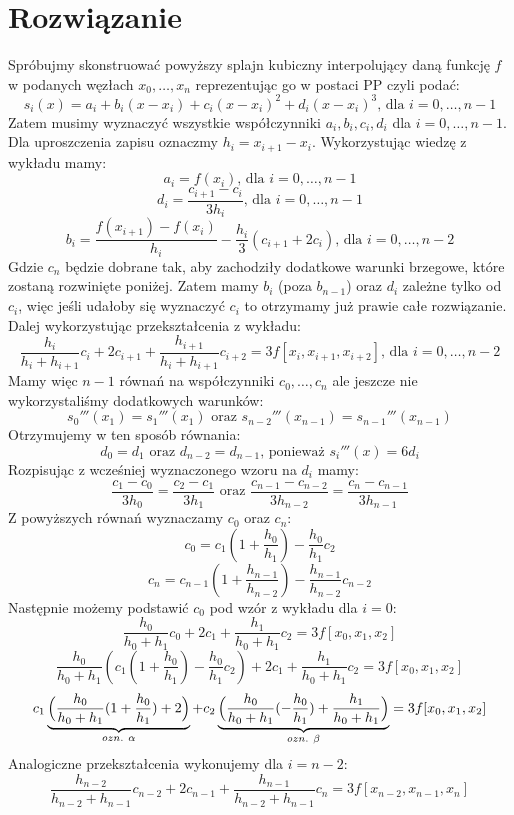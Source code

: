 \documentclass[a4paper]{article}
\begin{document}
\section*{\large Rozwiązanie }
Spróbujmy skonstruować powyższy splajn kubiczny interpolujący daną funkcję $f$ w podanych węzłach $x_0, \dots, x_n$ reprezentując go w postaci PP czyli podać:
$$
s_i(x) = a_i + b_i(x-x_i) + c_i(x-x_i)^2 + d_i(x-x_i)^3 \text{, dla } i = 0,\dots,n-1
$$
Zatem musimy wyznaczyć wszystkie współczynniki $a_i, b_i, c_i, d_i$ dla $i = 0,\dots,n-1$. Dla uproszczenia zapisu oznaczmy $h_i=x_{i+1}-x_i$. Wykorzystując wiedzę z wykładu mamy:
$$
a_i = f(x_i) \text{, dla } i = 0,\dots,n-1
$$
$$
d_i = \frac{c_{i+1}-c_i}{3h_i} \text{, dla } i = 0,\dots,n-1
$$
$$
b_i = \frac{f(x_{i+1})-f(x_{i})}{h_{i}}-\frac{h_{i}}{3}(c_{i+1}+2c_i) \text{, dla } i = 0,\dots,n-2
$$
Gdzie $c_n$ będzie dobrane tak, aby zachodziły dodatkowe warunki brzegowe, które zostaną rozwinięte poniżej. Zatem mamy $b_i$ (poza $b_{n-1}$) oraz $d_i$ zależne tylko od $c_i$, więc jeśli udałoby się wyznaczyć $c_i$ to otrzymamy już prawie całe rozwiązanie. Dalej wykorzystując przekształcenia z wykładu:
$$
\frac{h_i}{h_i+h_{i+1}}c_i + 2c_{i+1} + \frac{h_{i+1}}{h_i + h_{i+1}}c_{i+2} = 3f[x_i, x_{i+1},x_{i+2}] \text{, dla } i = 0,\dots,n-2
$$
Mamy więc $n-1$ równań na współczynniki $c_0, \dots, c_n$ ale jeszcze nie wykorzystaliśmy dodatkowych warunków:
$$
s_0'''(x_1) = s_1'''(x_1) \text{ oraz } s_{n-2}'''(x_{n-1}) = s_{n-1}'''(x_{n-1})
$$
Otrzymujemy w ten sposób równania:
$$
d_0 = d_1 \text{ oraz } d_{n-2} = d_{n-1} \text{, ponieważ } s_i'''(x) = 6d_i
$$
Rozpisując z wcześniej wyznaczonego wzoru na $d_i$ mamy:
$$
\frac{c_1-c_0}{3h_0} = \frac{c_2-c_1}{3h_1} \text{ oraz }
\frac{c_{n-1}-c_{n-2}}{3h_{n-2}} = \frac{c_{n}-c_{n-1}}{3h_{n-1}}
$$
Z powyższych równań wyznaczamy $c_0$ oraz $c_n$:
$$
c_0 = c_1(1+\frac{h_0}{h_1}) - \frac{h_0}{h_1}c_2
$$
$$
c_n = c_{n-1}(1+\frac{h_{n-1}}{h_{n-2}}) - \frac{h_{n-1}}{h_{n-2}}c_{n-2}
$$
Następnie możemy podstawić $c_0$ pod wzór z wykładu dla $i = 0$:
$$
\frac{h_0}{h_0+h_1}c_0 + 2c_{1} + \frac{h_{1}}{h_0 + h_{1}}c_{2} = 3f[x_0, x_{1},x_{2}]
$$
$$
\frac{h_0}{h_0+h_1}(c_1(1+\frac{h_0}{h_1}) - \frac{h_0}{h_1}c_2) + 2c_{1} + \frac{h_{1}}{h_0 + h_{1}}c_{2} = 3f[x_0, x_{1},x_{2}]
$$
$$
c_1\underbrace{\Bigl(\frac{h_0}{h_0+h_1}(1+\frac{h_0}{h_1})+2\Bigr)}_{ozn.\ \alpha} +
c_2\underbrace{\Bigl(\frac{h_0}{h_0+h_1}(-\frac{h_0}{h_1})+\frac{h_{1}}{h_0 + h_{1}} \Bigr)}_{ozn.\ \beta} = 3f[x_0, x_{1},x_{2}]
$$
Analogiczne przekształcenia wykonujemy dla $i=n-2$:
$$
\frac{h_{n-2}}{h_{n-2}+h_{n-1}}c_{n-2} + 2c_{n-1} + \frac{h_{n-1}}{h_{n-2} + h_{n-1}}c_{n} = 3f[x_{n-2}, x_{n-1},x_{n}]
$$
\end{document}
